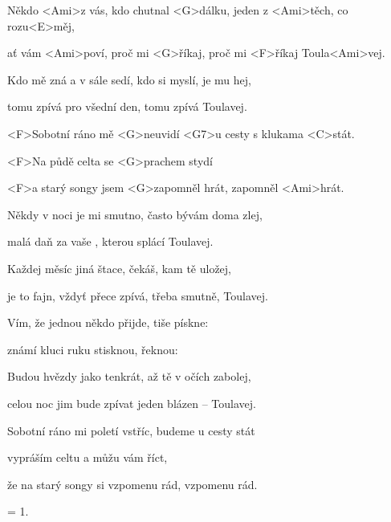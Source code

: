 

\zs
Někdo <Ami>z vás, kdo chutnal <G>dálku, jeden z <Ami>těch, co rozu<E>měj,

ať vám <Ami>poví, proč mi <G>říkaj, proč mi <F>říkaj Toula<Ami>vej.
\ks

\zs
Kdo mě zná a v sále sedí, kdo si myslí, je mu hej,

tomu zpívá pro všední den, tomu zpívá Toulavej.
\ks

\zr
<F>Sobotní ráno mě <G>neuvidí <G7>u cesty s klukama <C>stát.

<F>Na půdě celta se <G>prachem stydí

<F>a starý songy jsem <G>zapomněl hrát, zapomněl <Ami>hrát.
\kr

\zs
Někdy v noci je mi smutno, často bývám doma zlej,

malá daň za vaše , kterou splácí Toulavej.
\ks

\zs
Každej měsíc jiná štace, čekáš, kam tě uložej,

je to fajn, vždyť přece zpívá, třeba smutně, Toulavej.
\ks

\zr\kr

\zs
Vím, že jednou někdo přijde, tiše pískne: 

známí kluci ruku stisknou, řeknou: 
\ks

\zs
Budou hvězdy jako tenkrát, až tě v očích zabolej,

celou noc jim bude zpívat jeden blázen -- Toulavej.
\ks

\zr
Sobotní ráno mi poletí vstříc, budeme u cesty stát

vypráším celtu a můžu vám říct,

že na starý songy si vzpomenu rád, vzpomenu rád.
\kr

\zs = 1. \ks

\kp
